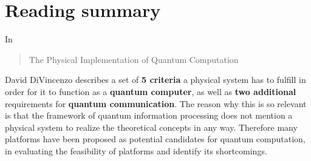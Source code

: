 \documentclass{alex_summary}
\begin{document}
\section*{Reading summary}

In \blockcquote{divincenzo_physical_2000}{The Physical Implementation of Quantum Computation} David DiVincenzo describes a set of \textbf{5 criteria} a physical system has to fulfill in order for it to function as a \textbf{quantum computer}, as well as \textbf{two additional} requirements for \textbf{quantum communication}. The reason why this is so relevant is that the framework of quantum information processing does not mention a physical system to realize the theoretical concepts in any way. Therefore many platforms have been proposed as potential candidates for quantum computation, in evaluating the feasibility of platforms and identify its shortcomings.
\end{document}
